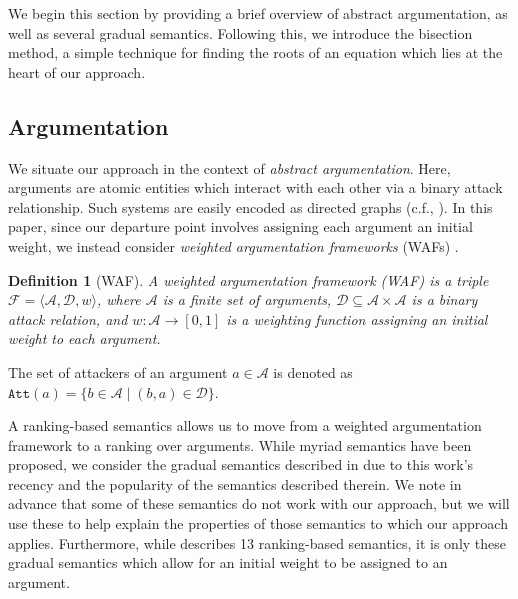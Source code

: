 \documentclass{article}
\newcommand{\AF}{\mathcal{F}}
\newcommand{\A}{\mathcal{A}}
\newcommand{\D}{\mathcal{D}}
\newcommand{\Att}{\mathtt{Att}}
\newtheorem{definition}{Definition}
\begin{document}
We begin this section by providing a brief overview of abstract argumentation, as well as  several gradual semantics. Following this, we introduce the bisection method, a simple technique for finding the roots of an equation which lies at the heart of our approach.

\subsection{Argumentation}

We situate our approach in the context of \emph{abstract argumentation}. Here, arguments are atomic entities which interact with each other via a binary attack relationship. Such systems are easily encoded as directed graphs (c.f., \cite{dung_acceptability_1995}). In this paper, since our departure point involves assigning each argument an initial weight, we instead consider \emph{weighted argumentation frameworks} (WAFs) \cite{dunne_weighted_2011,amgoud_acceptability_2017}.

\begin{definition}[WAF]
A weighted argumentation framework (WAF) is a triple $\AF=\langle \A,\D,w \rangle$, where $\A$ is a finite set of arguments, $\D \subseteq \A \times \A$ is a binary attack relation, and $w: \A \to [0,1]$ is a weighting function assigning an initial weight to each argument.
\end{definition}

The set of attackers of an argument $a \in \A$ is denoted as $\Att(a)=\{b \in \A \mid (b,a) \in \D\}$.

A ranking-based semantics allows us to move from a weighted argumentation framework  to a ranking over arguments. While myriad semantics have been proposed, we consider the gradual semantics described in \cite{AMGOUD2022103607} due to this work's recency and the popularity of the semantics described therein. We note in advance that some of these semantics do not work with our approach, but we will use these to help explain the properties of those semantics to which our approach applies. 
%
Furthermore, while \cite{bonzon_comparative_2016} describes 13 ranking-based semantics, it is only these gradual semantics which allow for an initial weight to be assigned to an argument.
\end{document}
